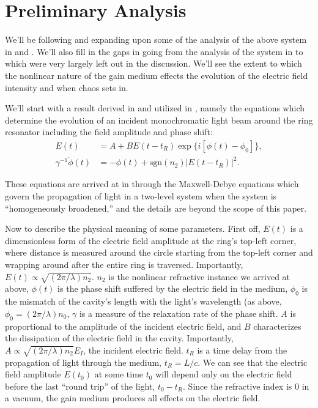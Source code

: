 \documentclass[12pt]{article}
\begin{document}

\section*{Preliminary Analysis}
We'll be following and expanding upon some of the analysis of the above system in
\cite{harrison_chaos_1986} and \cite{ikeda_optical_1980}. We'll also fill in the gaps in
going from the analysis of the system in \cite{ikdea_optical_1980} to
\cite{harrison_chaos_1986} which were very largely left out in the discussion. We'll see the
extent to which the nonlinear nature of the gain medium effects the evolution of the
electric field intensity and when chaos sets in.

We'll start with a result derived in \cite{ikeda_multiple-valued_1979} and utilized in
\cite{ikdea_optical_1980}, namely the equations which determine the evolution of an incident
monochromatic light beam around the ring resonator including the field amplitude and phase
shift:
\begin{align}
  \label{eq:1}
  E(t) &= A + BE(t - t_R)\exp\{i[\phi(t) - \phi_0]\},\\
  \gamma^{-1}\dot{\phi}(t) &= -\phi(t) + \text{sgn}(n_2)|E(t - t_R)|^2.
\end{align}

These equations are arrived at in \cite{ikeda_multiple-valued_1979} through the
Maxwell-Debye equations which govern the propagation of light in a two-level system when the
system is ``homogeneously broadened,'' and the details are beyond the scope of this paper.

Now to describe the physical meaning of some parameters. First off, $E(t)$ is a
dimensionless form of the electric field amplitude at the ring's top-left corner, where
distance is measured around the circle starting from the top-left corner and wrapping around
after the entire ring is traversed. Importantly, $E(t) \propto
\sqrt{(2\pi/\lambda)n_2}$. $n_2$ is the nonlinear refractive instance we arrived at above,
$\phi(t)$ is the phase shift suffered by the electric field in the medium, $\phi_0$ is the
mismatch of the cavity's length with the light's wavelength (as above,
$\phi_0 = (2\pi/\lambda)n_0$, $\gamma$ is a measure of the relaxation rate of the phase
shift. $A$ is proportional to the amplitude of the incident electric field, and $B$
characterizes the dissipation of the electric field in the cavity. Importantly,
$A \propto \sqrt{(2\pi/\lambda)n_2}E_I$, the incident electric field. $t_R$ is a time delay
from the propagation of light through the medium, $t_R = L/c$. We can see that the electric
field amplitude $E(t_0)$ at some time $t_0$ will depend only on the electric field before
the last ``round trip'' of the light, $t_{0} - t_R$. Since the refractive index is $0$ in a
vacuum, the gain medium produces all effects on the electric field.
\end{document}
